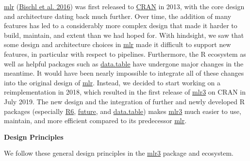 \documentclass[
]{scrbook}
\begin{document}
\href{https://mlr.mlr-org.com}{mlr} (\protect\hyperlink{ref-mlr}{Bischl et al. 2016}) was first released to \href{https://cran.r-project.org}{CRAN} in 2013, with the core design and architecture dating back much further.
Over time, the addition of many features has led to a considerably more complex design that made it harder to build, maintain, and extent than we had hoped for.
With hindsight, we saw that some design and architecture choices in \href{https://mlr.mlr-org.com}{mlr} made it difficult to support new features, in particular with respect to pipelines.
Furthermore, the R ecosystem as well as helpful packages such as \href{https://cran.r-project.org/package=data.table}{data.table} have undergone major changes in the meantime.
It would have been nearly impossible to integrate all of these changes into the original design of \href{https://mlr.mlr-org.com}{mlr}.
Instead, we decided to start working on a reimplementation in 2018, which resulted in the first release of \href{https://mlr3.mlr-org.com}{mlr3} on CRAN in July 2019.
The new design and the integration of further and newly developed R packages (especially \href{https://cran.r-project.org/package=R6}{R6}, \href{https://cran.r-project.org/package=future}{future}, and \href{https://cran.r-project.org/package=data.table}{data.table}) makes \href{https://mlr3.mlr-org.com}{mlr3} much easier to use, maintain, and more efficient compared to its predecessor \href{https://mlr.mlr-org.com}{mlr}.

\textbf{Design Principles}

We follow these general design principles in the \href{https://mlr3.mlr-org.com}{mlr3} package and ecosystem.
\end{document}
